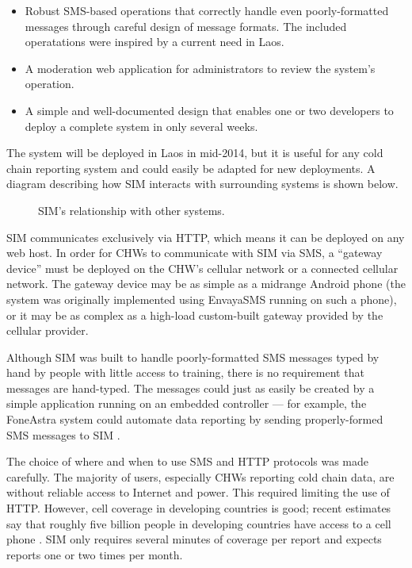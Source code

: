 \documentclass{acm_proc_article-sp}
\begin{document}
\begin{itemize}
\item Robust SMS-based operations that correctly handle even poorly-formatted messages through careful design of message formats. The included operatations were inspired by a current need in Laos.
\item A moderation web application for administrators to review the system's operation.
\item A simple and well-documented design that enables one or two developers to deploy a complete system in only several weeks.
\end{itemize}

The system will be deployed in Laos in mid-2014, but it is useful for any cold chain reporting system and could easily be adapted for new deployments. A diagram describing how SIM interacts with surrounding systems is shown below.

\begin{figure*}
\centering
{}
\caption{SIM's relationship with other systems.}
\end{figure*}

SIM communicates exclusively via HTTP, which means it can be deployed on any web host. In order for CHWs to communicate with SIM via SMS, a ``gateway device'' must be deployed on the CHW's cellular network or a connected cellular network. The gateway device may be as simple as a midrange Android phone (the system was originally implemented using EnvayaSMS running on such a phone), or it may be as complex as a high-load custom-built gateway provided by the cellular provider. 

Although SIM was built to handle poorly-formatted SMS messages typed by hand by people with little access to training, there is no requirement that messages are hand-typed. The messages could just as easily be created by a simple application running on an embedded controller --- for example, the FoneAstra system could automate data reporting by sending properly-formed SMS messages to SIM \cite{foneastra}.

The choice of where and when to use SMS and HTTP protocols was made carefully. The majority of users, especially CHWs reporting cold chain data, are without reliable access to Internet and power. This required limiting the use of HTTP. However, cell coverage in developing countries is good; recent estimates say that roughly five billion people in developing countries have access to a cell phone \cite{worldbank:mobileaccess}. SIM only requires several minutes of coverage per report and expects reports one or two times per month.
\end{document}
